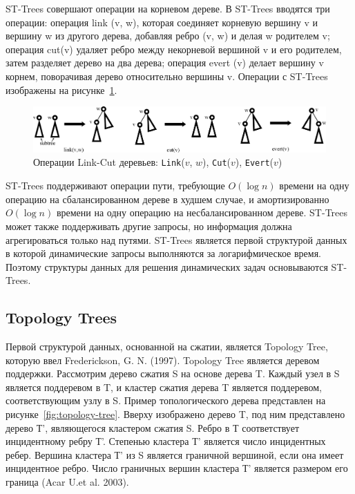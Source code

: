 \documentclass[specification,annotation]{itmo-student-thesis}
\begin{document}
ST-Trees совершают операции на корневом дереве. В ST-Trees вводятся три операции: операция link (v, w), которая соединяет корневую вершину v и вершину w из 
другого дерева, добавляя ребро (v, w) и делая w родителем v; операция cut(v) удаляет ребро между некорневой вершиной v и его родителем, затем разделяет дерево 
на два дерева; операция evert (v) делает вершину v корнем, поворачивая дерево относительно вершины v. Операции с ST-Trees изображены на 
рисунке~\ref{fig:link-cut-tree}.

\begin{figure}[!ht]
\centering
\includegraphics[width=\textwidth]{pic/link-cut-tree.png}
\caption{Операции Link-Cut деревьев: \texttt{Link}($v$, $w$), \texttt{Cut}($v$), \texttt{Evert}($v$)}\label{fig:link-cut-tree}
\end{figure}

ST-Trees поддерживают операции пути, требующие $O(\log n)$ времени на одну операцию на 
сбалансированном дереве в худшем случае, и амортизированно $O(\log n)$ времени 
на одну операцию на несбалансированном дереве. ST-Trees может также поддерживать другие запросы, но информация должна агрегироваться только над путями. 
ST-Trees является первой структурой данных в которой динамические запросы выполняются за логарифмическое время. Поэтому структуры данных для решения 
динамических задач основываются ST-Trees. 

\subsection{Topology Trees}

Первой структурой данных, основанной на сжатии, является Topology Tree, которую ввел Frederickson, G. N. (1997). Topology Tree является деревом поддержки.
Рассмотрим дерево сжатия S на основе дерева T. Каждый узел в S является поддеревом в T, и кластер сжатия дерева T является поддеревом, соответствующим узлу в 
S. Пример топологического дерева представлен на рисунке~\ref{fig:topology-tree}. Вверху изображено дерево T, под ним представлено дерево Т', являющегося 
кластером сжатия S. Ребро в Т соответствует инцидентному ребру Т'. Степенью кластера Т' является число инцидентных ребер. Вершина кластера Т' из S является 
граничной вершиной, если она имеет инцидентное ребро. Число граничных вершин кластера Т' является размером его граница (Acar U.et al. 2003).
\end{document}
